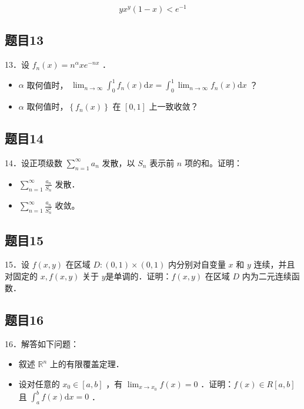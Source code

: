 \documentclass{article}
\begin{document}
\[
y x^{y}(1-x)<e^{-1}
\]

\subsection{题目13}
13．设 \(f_{n}(x)=n^{\alpha} x e^{-n x}\) ．

\begin{itemize}
  \item[（1）] \(\alpha\) 取何值时， \(\lim _{n \rightarrow \infty} \int_{0}^{1} f_{n}(x) \mathrm{d} x=\int_{0}^{1} \lim _{n \rightarrow \infty} f_{n}(x) \mathrm{d} x\) ？
  \item[（2）] \(\alpha\) 取何值时，\(\left\{f_{n}(x)\right\}\) 在 \([0,1]\) 上一致收敛？
\end{itemize}

\subsection{题目14}
14．设正项级数 \(\sum_{n=1}^{\infty} a_{n}\) 发散，以 \(S_{n}\) 表示前 \(n\) 项的和。证明：

\begin{itemize}
  \item[（1）] \(\sum_{n=1}^{\infty} \frac{a_{n}}{S_{n}}\) 发散．
  \item[（2）] \(\sum_{n=1}^{\infty} \frac{a_{n}}{S_{n}^{2}}\) 收敛。
\end{itemize}

\subsection{题目15}
15．设 \(f(x, y)\) 在区域 \(D:(0,1) \times(0,1)\) 内分别对自变量 \(x\) 和 \(y\) 连续，并且对固定的 \(x, f(x, y)\) 关于 \(y\)是单调的．证明：\(f(x, y)\) 在区域 \(D\) 内为二元连续函数．

\subsection{题目16}
16．解答如下问题：

\begin{itemize}
  \item[（1）] 叙述 \(\mathbb{R}^{n}\) 上的有限覆盖定理．
  \item[（2）] 设对任意的 \(x_{0} \in[a, b]\) ，有 \(\lim _{x \rightarrow x_{0}} f(x)=0\) ．证明：\(f(x) \in R[a, b]\) 且 \(\int_{a}^{b} f(x) \mathrm{d} x=0\) ．
\end{itemize}
\end{document}
